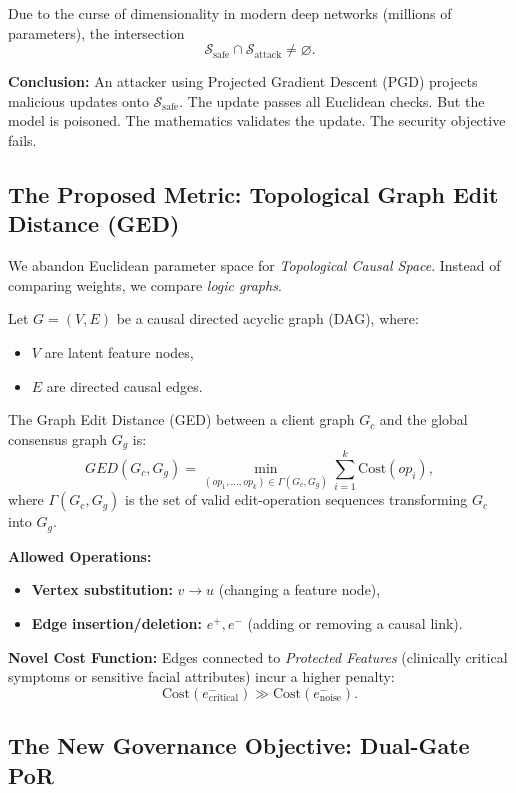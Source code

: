 \documentclass[journal]{IEEEtran}
\begin{document}
Due to the curse of dimensionality in modern deep networks (millions of parameters), the intersection
\[
\mathcal{S}_{\text{safe}} \cap \mathcal{S}_{\text{attack}} \neq \varnothing. \]

\textbf{Conclusion:}
An attacker using Projected Gradient Descent (PGD) projects malicious updates onto $\mathcal{S}_{\text{safe}}$. The update passes all Euclidean checks. But the model is poisoned. The mathematics validates the update. The security objective fails.

\subsection{The Proposed Metric: Topological Graph Edit Distance (GED)}

We abandon Euclidean parameter space for \emph{Topological Causal Space}. Instead of comparing weights, we compare \emph{logic graphs}.

Let $G = (V, E)$ be a causal directed acyclic graph (DAG), where:
\begin{itemize}
 \item $V$ are latent feature nodes,
 \item $E$ are directed causal edges. \end{itemize}

The Graph Edit Distance (GED) between a client graph $G_c$ and the global consensus graph $G_g$ is:
\[
GED(G_c, G_g)
=
\min_{(op_1,\dots,op_k)\in\Gamma(G_c,G_g)}
\sum_{i=1}^{k} \text{Cost}(op_i),
\]
where $\Gamma(G_c,G_g)$ is the set of valid edit-operation sequences transforming $G_c$ into $G_g$.

\textbf{Allowed Operations:}
\begin{itemize}
 \item \textbf{Vertex substitution:} $v \rightarrow u$ (changing a feature node),
 \item \textbf{Edge insertion/deletion:} $e^{+}, e^{-}$ (adding or removing a causal link). \end{itemize}

\textbf{Novel Cost Function:}
Edges connected to \emph{Protected Features} (clinically critical symptoms or sensitive facial attributes) incur a higher penalty:
\[
\text{Cost}(e^{-}_{\text{critical}}) \gg \text{Cost}(e^{-}_{\text{noise}}). \]

\subsection{The New Governance Objective: Dual-Gate PoR}
\end{document}

